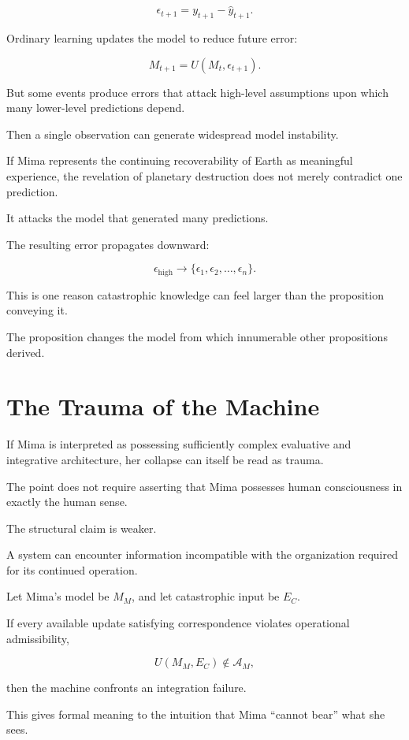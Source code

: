 \documentclass[11pt,oneside]{book}
\theoremstyle{definition}
\theoremstyle{remark}
\newcommand{\A}{\mathcal{A}}
\begin{document}
\[
\epsilon_{t+1}
=
y_{t+1}-\hat y_{t+1}.
\]

Ordinary learning updates the model to reduce future error:

\[
M_{t+1}
=
U(M_t,\epsilon_{t+1}).
\]

But some events produce errors that attack high-level assumptions upon which many lower-level predictions depend.

Then a single observation can generate widespread model instability.

If Mima represents the continuing recoverability of Earth as meaningful experience, the revelation of planetary destruction does not merely contradict one prediction.

It attacks the model that generated many predictions.

The resulting error propagates downward:

\[
\epsilon_{\mathrm{high}}
\rightarrow
\{\epsilon_1,\epsilon_2,\ldots,\epsilon_n\}.
\]

This is one reason catastrophic knowledge can feel larger than the proposition conveying it.

The proposition changes the model from which innumerable other propositions derived.

\section{The Trauma of the Machine}

If Mima is interpreted as possessing sufficiently complex evaluative and integrative architecture, her collapse can itself be read as trauma.

The point does not require asserting that Mima possesses human consciousness in exactly the human sense.

The structural claim is weaker.

A system can encounter information incompatible with the organization required for its continued operation.

Let Mima's model be \(M_M\), and let catastrophic input be \(E_C\).

If every available update satisfying correspondence violates operational admissibility,

\[
U(M_M,E_C)\notin\A_M,
\]

then the machine confronts an integration failure.

This gives formal meaning to the intuition that Mima ``cannot bear'' what she sees.
\end{document}
